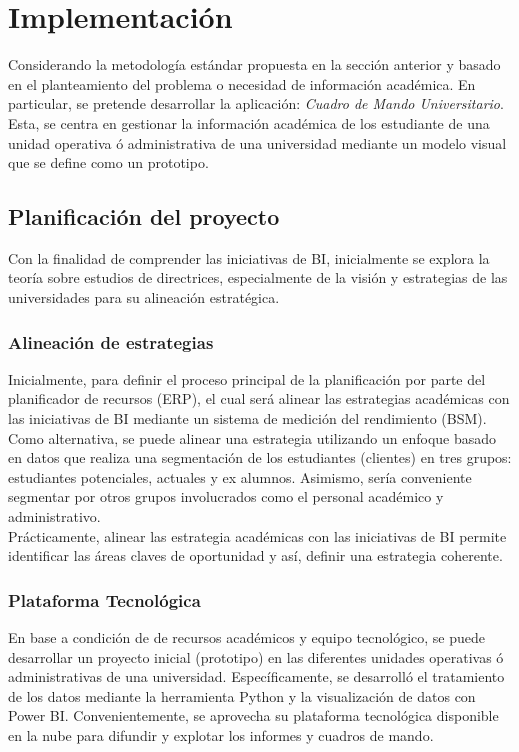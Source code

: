 \documentclass[12pt,jou]{apa7}
\begin{document}

\section{Implementación}

Considerando la metodología estándar propuesta en la sección anterior y basado en el planteamiento del problema o necesidad de información académica. En particular, se pretende desarrollar la aplicación: \textit{Cuadro de Mando Universitario}. Esta, se centra en gestionar la información académica de los estudiante de una unidad operativa ó administrativa de una universidad mediante un modelo visual que se define como un prototipo.

\subsection{Planificación del proyecto}
Con la finalidad de comprender las iniciativas de BI, inicialmente se explora la teoría sobre estudios de directrices, especialmente de la visión y estrategias de las universidades para su alineación estratégica.

\subsubsection{Alineación de estrategias}
Inicialmente, para definir el proceso principal de la planificación por parte del planificador de recursos (ERP), el cual será alinear las estrategias académicas con las iniciativas de BI mediante un sistema de medición del rendimiento (BSM). Como alternativa, se puede alinear una estrategia utilizando un enfoque basado en datos que realiza una segmentación de los estudiantes (clientes) en tres grupos: estudiantes potenciales, actuales y ex alumnos. Asimismo, sería conveniente segmentar por otros grupos involucrados como el personal académico y administrativo.\\

Prácticamente, alinear las estrategia académicas con las iniciativas de BI permite identificar las áreas claves de oportunidad y así, definir una estrategia coherente.

\subsubsection{Plataforma Tecnológica}
En base a condición de de recursos académicos y equipo tecnológico, se puede desarrollar un proyecto inicial (prototipo) en las diferentes unidades operativas ó administrativas de una universidad. Específicamente, se desarrolló el tratamiento de los datos mediante la herramienta Python y la visualización de datos con Power BI. Convenientemente, se aprovecha su plataforma tecnológica disponible en la nube para difundir y explotar los informes y cuadros de mando.
\end{document}
